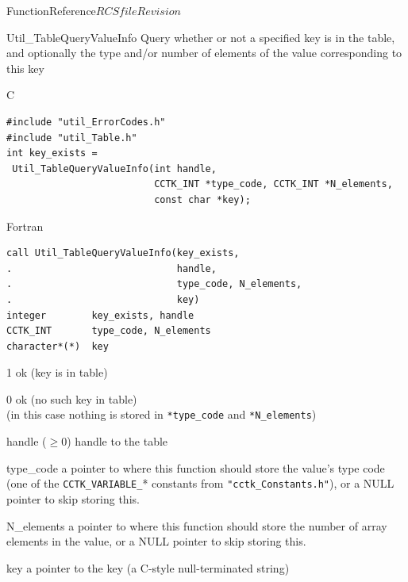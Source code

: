 \begin{cactuspart}{FunctionReference}{$RCSfile$}{$Revision$}

\begin{FunctionDescription}{Util\_TableQueryValueInfo}
\label{Util-TableQueryValueInfo}
Query whether or not a specified key is in the table, and optionally
the type and/or number of elements of the value corresponding to this key

\begin{SynopsisSection}
\begin{Synopsis}{C}
\begin{verbatim}
#include "util_ErrorCodes.h"
#include "util_Table.h"
int key_exists =
 Util_TableQueryValueInfo(int handle,
                          CCTK_INT *type_code, CCTK_INT *N_elements,
                          const char *key);
\end{verbatim}
\end{Synopsis}
\begin{Synopsis}{Fortran}
\begin{verbatim}
call Util_TableQueryValueInfo(key_exists,
.                             handle,
.                             type_code, N_elements,
.                             key)
integer        key_exists, handle
CCTK_INT       type_code, N_elements
character*(*)  key
\end{verbatim}
\end{Synopsis}
\end{SynopsisSection}

\begin{ResultSection}
\begin{Result}{\rm 1}
ok (key is in table)
\end{Result}
\begin{Result}{\rm 0}
ok (no such key in table)\\
(in this case nothing is stored in \verb|*type_code| and \verb|*N_elements|)
\end{Result}
\end{ResultSection}

\begin{ParameterSection}
\begin{Parameter}{handle ($\ge 0$)}
handle to the table
\end{Parameter}
\begin{Parameter}{type\_code}
a pointer to where this function should store the value's type code
(one of the \verb|CCTK_VARIABLE_|* constants from \verb|"cctk_Constants.h"|),
or a NULL pointer to skip storing this.
\end{Parameter}
\begin{Parameter}{N\_elements}
a pointer to where this function should store
the number of array elements in the value,
or a NULL pointer to skip storing this.
\end{Parameter}
\begin{Parameter}{key}
a pointer to the key (a C-style null-terminated string)
\end{Parameter}
\end{ParameterSection}


\end{FunctionDescription}
\end{cactuspart}
